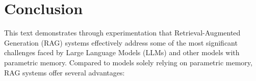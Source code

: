 \documentclass{wseas}
\begin{document}


\section{Conclusion}
This text demonstrates through experimentation that Retrieval-Augmented
Generation (RAG) systems effectively address some of the most
significant challenges faced by Large Language Models (LLMs) and other
models with parametric memory. Compared to models solely relying on
parametric memory, RAG systems offer several advantages:
\end{document}
